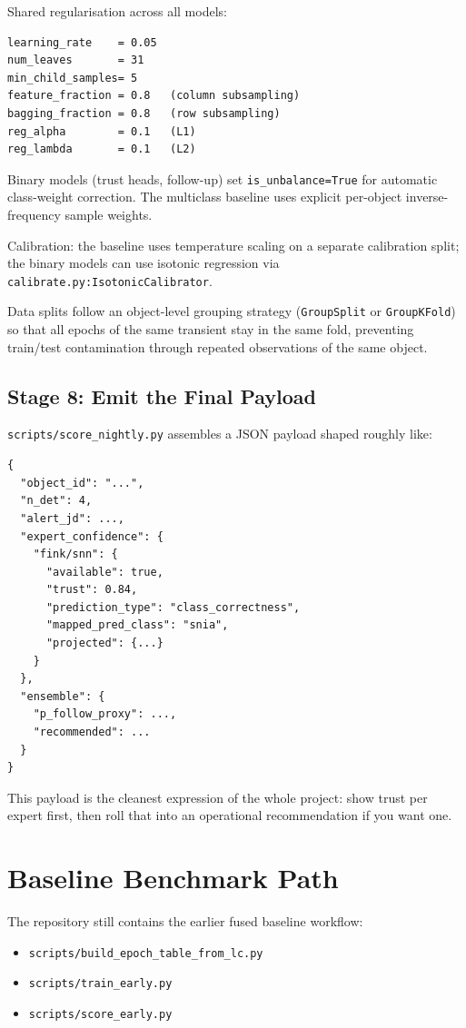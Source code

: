 \documentclass[11pt]{article}
\newcommand{\code}[1]{\texttt{#1}}
\begin{document}
Shared regularisation across all models:

\begin{verbatim}
learning_rate    = 0.05
num_leaves       = 31
min_child_samples= 5
feature_fraction = 0.8   (column subsampling)
bagging_fraction = 0.8   (row subsampling)
reg_alpha        = 0.1   (L1)
reg_lambda       = 0.1   (L2)
\end{verbatim}

Binary models (trust heads, follow-up) set \code{is\_unbalance=True} for automatic class-weight correction. The multiclass baseline uses explicit per-object inverse-frequency sample weights.

Calibration: the baseline uses temperature scaling on a separate calibration split; the binary models can use isotonic regression via \code{calibrate.py:IsotonicCalibrator}.

Data splits follow an object-level grouping strategy (\code{GroupSplit} or \code{GroupKFold}) so that all epochs of the same transient stay in the same fold, preventing train/test contamination through repeated observations of the same object.

\subsection{Stage 8: Emit the Final Payload}

\code{scripts/score\_nightly.py} assembles a JSON payload shaped roughly like:

\begin{verbatim}
{
  "object_id": "...",
  "n_det": 4,
  "alert_jd": ...,
  "expert_confidence": {
    "fink/snn": {
      "available": true,
      "trust": 0.84,
      "prediction_type": "class_correctness",
      "mapped_pred_class": "snia",
      "projected": {...}
    }
  },
  "ensemble": {
    "p_follow_proxy": ...,
    "recommended": ...
  }
}
\end{verbatim}

This payload is the cleanest expression of the whole project: show trust per expert first, then roll that into an operational recommendation if you want one.

\section{Baseline Benchmark Path}

The repository still contains the earlier fused baseline workflow:

\begin{itemize}
\item \code{scripts/build\_epoch\_table\_from\_lc.py}
\item \code{scripts/train\_early.py}
\item \code{scripts/score\_early.py}
\end{itemize}
\end{document}

